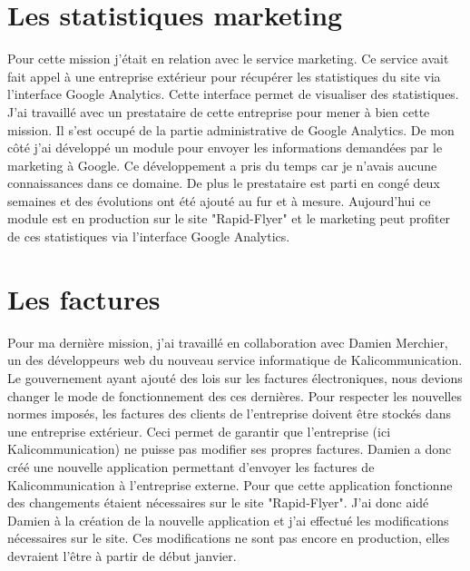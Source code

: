 \section{Les statistiques marketing}
Pour cette mission j'était en relation avec le service marketing. Ce service avait fait appel à une entreprise extérieur pour récupérer les statistiques du site via l'interface Google Analytics. Cette interface permet de visualiser des statistiques.\newline
J'ai travaillé avec un prestataire de cette entreprise pour mener à bien cette mission. Il s'est occupé de la partie administrative de Google Analytics. De mon côté j'ai développé un module pour envoyer les informations demandées par le marketing à Google. Ce développement a pris du temps car je n'avais aucune connaissances dans ce domaine. De plus le prestataire est parti en congé deux semaines et des évolutions ont été ajouté au fur et à mesure. Aujourd'hui ce module est en production sur le site "Rapid-Flyer" et le marketing peut profiter de ces statistiques via l'interface Google Analytics.

\section{Les factures}
Pour ma dernière mission, j'ai travaillé en collaboration avec Damien Merchier, un des développeurs web du nouveau service informatique de Kalicommunication.\newline
Le gouvernement ayant ajouté des lois sur les factures électroniques, nous devions changer le mode de fonctionnement des ces dernières. Pour respecter les nouvelles normes imposés, les factures des clients de l'entreprise doivent être stockés dans une entreprise extérieur. Ceci permet de garantir que l'entreprise (ici Kalicommunication) ne puisse pas modifier ses propres factures.\newline
Damien a donc créé une nouvelle application permettant d'envoyer les factures de Kalicommunication à l'entreprise externe. Pour que cette application fonctionne des changements étaient nécessaires sur le site "Rapid-Flyer". J'ai donc aidé Damien à la création de la nouvelle application et j'ai effectué les modifications nécessaires sur le site. Ces modifications ne sont pas encore en production, elles devraient l'être à partir de début janvier.